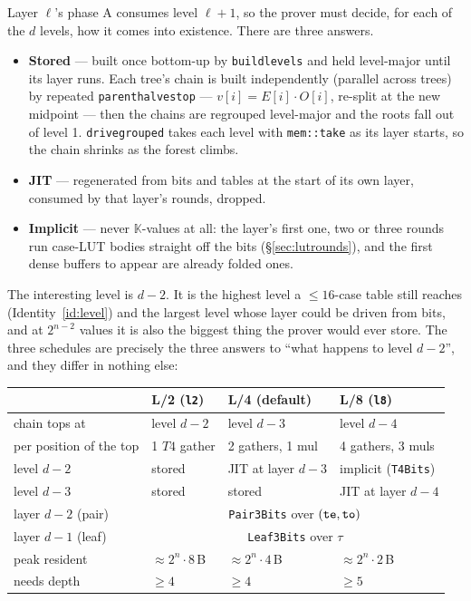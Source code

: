 \documentclass[11pt]{article}
\newcommand{\K}{\mathbb{K}}            %
\newcommand{\code}[1]{{\def\_{\textunderscore\allowbreak}\texttt{#1}}}
\theoremstyle{definition}
\begin{document}
Layer $\ell$'s phase A consumes level $\ell + 1$, so the prover must
decide, for each of the $d$ levels, how it comes into existence.  There
are three answers.
\begin{itemize}[itemsep=2pt]
\item \textbf{Stored} --- built once bottom-up by \code{build\_levels}
  and held level-major until its layer runs.  Each tree's chain is built
  independently (parallel across trees) by repeated
  \code{parent\_halves\_top} --- $v[i] = E[i]\cdot O[i]$, re-split at the
  new midpoint --- then the chains are regrouped level-major and the
  roots fall out of level 1.  \code{drive\_grouped} takes each level with
  \code{mem::take} as its layer starts, so the chain shrinks as the
  forest climbs.
\item \textbf{JIT} --- regenerated from bits and tables at the start of
  its own layer, consumed by that layer's rounds, dropped.
\item \textbf{Implicit} --- never $\K$-values at all: the layer's first
  one, two or three rounds run case-LUT bodies straight off the bits
  (\S\ref{sec:lutrounds}), and the first dense buffers to appear are
  already folded ones.
\end{itemize}
The interesting level is $d - 2$.  It is the highest level a
$\le 16$-case table still reaches (Identity~\ref{id:level}) and the
largest level whose layer could be driven from bits, and at
$2^{n-2}$ values it is also the biggest thing the prover would ever
store.  The three schedules are precisely the three answers to ``what
happens to level $d-2$'', and they differ in nothing else:

\begin{center}
\small
\begin{tabular}{llll}
\toprule
 & L/2 (\code{l2}) & L/4 (default) & L/8 (\code{l8}) \\
\midrule
chain tops at        & level $d{-}2$ & level $d{-}3$ & level $d{-}4$ \\
per position of the top & 1 $T4$ gather & 2 gathers, 1 mul & 4 gathers, 3 muls \\
level $d{-}2$        & stored & JIT at layer $d{-}3$ & implicit (\code{T4Bits}) \\
level $d{-}3$        & stored & stored & JIT at layer $d{-}4$ \\
layer $d{-}2$ (pair) & \multicolumn{3}{c}{\code{Pair3Bits} over $(\code{te}, \code{to})$} \\
layer $d{-}1$ (leaf) & \multicolumn{3}{c}{\code{Leaf3Bits} over $\tau$} \\
peak resident        & ${\approx}2^n{\cdot}8$\,B & ${\approx}2^n{\cdot}4$\,B
                     & ${\approx}2^n{\cdot}2$\,B \\
needs depth          & $\ge 4$ & $\ge 4$ & $\ge 5$ \\
\bottomrule
\end{tabular}
\end{center}
\end{document}
